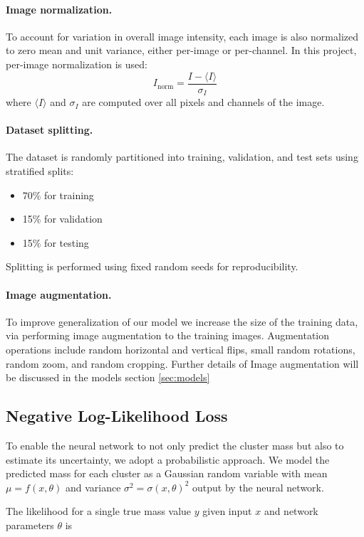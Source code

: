 \paragraph{Image normalization.}
To account for variation in overall image intensity, 
each image is also normalized to zero mean and unit variance,
either per-image or per-channel. In this project, 
per-image normalization is used:
\[
I_{\text{norm}} = \frac{I - \langle I \rangle}{\sigma_I}
\]
where $\langle I \rangle$ and $\sigma_I$ are computed over all 
pixels and channels of the image.

\paragraph{Dataset splitting.}
The dataset is randomly partitioned into training, validation, and test sets using stratified splits:
\begin{itemize}
    \item 70\% for training
    \item 15\% for validation
    \item 15\% for testing
\end{itemize}
Splitting is performed using fixed random seeds for 
reproducibility.

\paragraph{Image augmentation.}
To improve generalization of our model we increase the
size of the training data, via performing image augmentation to the 
training images. Augmentation operations include random horizontal 
and vertical flips, small random rotations, random zoom, and random 
cropping. Further details of Image augmentation will be discussed in the 
models section \ref{sec:models}

\subsection{Negative Log-Likelihood Loss}

To enable the neural network to not only predict the cluster mass 
but also to estimate its uncertainty, we adopt a probabilistic 
approach. We model the predicted mass for each cluster as a 
Gaussian random variable with mean $\mu = f(x, \theta)$ and variance 
$\sigma^2 = \sigma(x, \theta)^2$ output by the neural network.

The likelihood for a single true mass value $y$ given input $x$ 
and network parameters $\theta$ is

